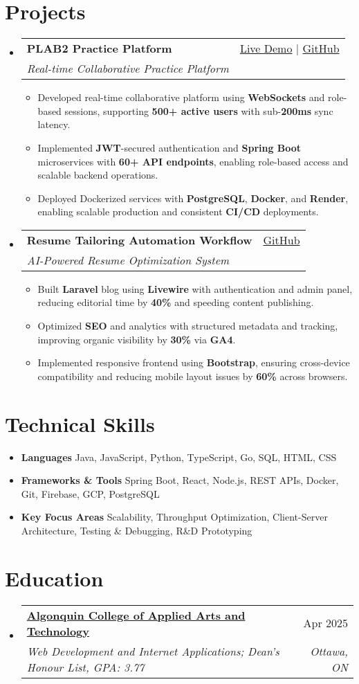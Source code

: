 \documentclass[letterpaper,11pt]{article}
\makeatletter
\newcommand{\resumeItem}[1]{\item\small{#1 \vspace{-2pt}}}
\newcommand{\resumeSubheading}[4]{
  \vspace{-1pt}\item
    \begin{tabular*}{0.97\textwidth}[t]{l@{\extracolsep{\fill}}r}
      \textbf{#1} & #2 \\
      \textit{\small#3} & \textit{\small #4} \\
    \end{tabular*}\vspace{-5pt}
}
\newcommand{\resumeSubHeadingListStart}{\begin{itemize}[leftmargin=*]}
\newcommand{\resumeSubHeadingListEnd}{\end{itemize}}
\newcommand{\resumeItemListStart}{\begin{itemize}}
\newcommand{\resumeItemListEnd}{\end{itemize}\vspace{-5pt}}
\makeatother
\begin{document}
\section{Projects}
  \resumeSubHeadingListStart
    \resumeSubheading
      {\textbf{PLAB2 Practice Platform}}{\href{https://plab2practice.com}{Live Demo} | \href{https://github.com/altansaid/plab2projectnew}{GitHub}}
      {Real-time Collaborative Practice Platform}{}
      \resumeItemListStart
        \resumeItem{Developed real-time collaborative platform using \textbf{WebSockets} and role-based sessions, supporting \textbf{500+ active users} with sub-\textbf{200ms} sync latency.}
        \resumeItem{Implemented \textbf{JWT}-secured authentication and \textbf{Spring Boot} microservices with \textbf{60+ API endpoints}, enabling role-based access and scalable backend operations.}
        \resumeItem{Deployed Dockerized services with \textbf{PostgreSQL}, \textbf{Docker}, and \textbf{Render}, enabling scalable production and consistent \textbf{CI/CD} deployments.}
      \resumeItemListEnd

    \resumeSubheading
      {\textbf{Resume Tailoring Automation Workflow}}{\href{https://github.com/altansaid/resume-automation-workflow}{GitHub}}
      {AI-Powered Resume Optimization System}{}
      \resumeItemListStart
    \resumeItem{Built \textbf{Laravel} blog using \textbf{Livewire} with authentication and admin panel, reducing editorial time by \textbf{40\%} and speeding content publishing.}
    \resumeItem{Optimized \textbf{SEO} and analytics with structured metadata and tracking, improving organic visibility by \textbf{30\%} via \textbf{GA4}.}
    \resumeItem{Implemented responsive frontend using \textbf{Bootstrap}, ensuring cross-device compatibility and reducing mobile layout issues by \textbf{60\%} across browsers.}



      \resumeItemListEnd
  \resumeSubHeadingListEnd

\section{Technical Skills}
  \resumeItemListStart
    \resumeItem{\textbf{Languages}}{Java, JavaScript, Python, TypeScript, Go, SQL, HTML, CSS}
    \resumeItem{\textbf{Frameworks \& Tools}}{Spring Boot, React, Node.js, REST APIs, Docker, Git, Firebase, GCP, PostgreSQL}
    \resumeItem{\textbf{Key Focus Areas}}{Scalability, Throughput Optimization, Client-Server Architecture, Testing \& Debugging, R\&D Prototyping}
  \resumeItemListEnd

\section{Education}
  \resumeSubHeadingListStart
    \resumeSubheading
      {\href{https://www.algonquincollege.com/sat/program/web-development-internet-applications/}{Algonquin College of Applied Arts and Technology}}{Apr 2025}
      {Web Development and Internet Applications; Dean's Honour List, GPA: 3.77}{Ottawa, ON}
  \resumeSubHeadingListEnd
\end{document}
